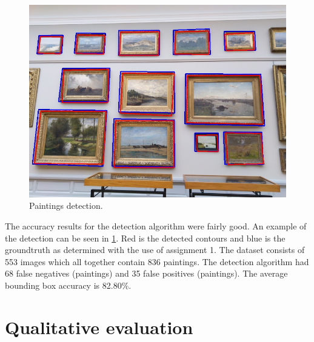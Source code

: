 \begin{figure}
    \includegraphics[width=\linewidth]{images/IMG_20190323_121447.jpg}
    \centering
    \caption{Paintings detection.}
    \label{fig:paiting_detection_with_ground_truth}
  \end{figure}

The accuracy results for the detection algorithm were fairly good. An example of the detection can be seen in \ref{fig:paiting_detection_with_ground_truth}. Red is the detected contours and blue is the groundtruth as determined with the use of assignment 1. The dataset consists of 553 images which all together contain 836 paintings. The detection algorithm had 68 false negatives (paintings) and 35 false positives (paintings). The average bounding box accuracy is 82.80\%.

\section{Qualitative evaluation}
